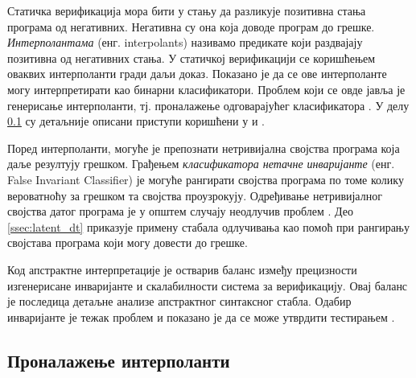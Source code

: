 \documentclass[a4paper]{article}
\begin{document}
{Статичка верификација мора бити у стању да разликује позитивна стања програма од негативних.
Негативна су она која доводе програм до грешке. \textit{Интерполантама} (енг. interpolants)
називамо предикате који раздвајају позитивна од негативних стања.
У статичкој верификацији се коришћењем оваквих интерполанти гради даљи доказ.
Показано је да се ове интерполанте могу интерпретирати као бинарни класификатори.
Проблем који се овде јавља је генерисање интерполанти, тј. проналажење одговарајућег класификатора \cite{Sharma_interpolantsas}.
У делу  \ref{ssec:interpolant} су детаљније описани приступи коришћени у \cite{Sharma_interpolantsas} и \cite{KrishnaPW15}.

Поред интерполанти, могуће је препознати нетривијална својства програма која даље резултују грешком.
Грађењем \textit{класификатора нетачне инваријанте} (енг. False Invariant Classifier) је могуће рангирати
својства програма по томе колику вероватноћу за грешком та својства проузрокују.
Одређивање нетривијалног својства датог програма је у општем случају неодлучив проблем \cite{turing, Brun04findinglatent}.
Део \ref{ssec:latent_dt} приказује примену стабала одлучивања као помоћ при рангирању својстава програма који могу
довести до грешке.

Код апстрактне интерпретације је остварив баланс између прецизности изгенерисане инваријанте и скалабилности система за верификацију. Овај баланс је последица детаљне анализе апстрактног синтаксног стабла. Одабир инваријанте је тежак проблем и показано је да се може утврдити тестирањем \cite{Sharma_interpolantsas, KrishnaPW15}.


\label{sec:primene}

\subsection{Проналажење интерполанти}
\label{ssec:interpolant}

}
\end{document}
